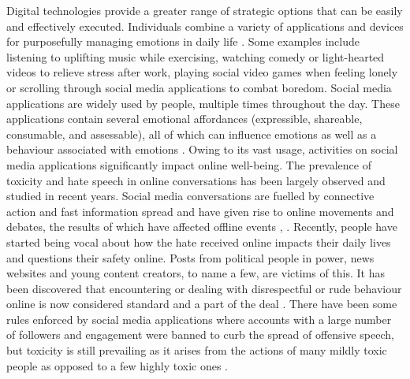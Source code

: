 \documentclass[acmtog]{acmart}
\begin{document}
Digital technologies provide a greater range of strategic options that can be easily and effectively executed. Individuals combine a variety of applications and devices for purposefully managing emotions in daily life \cite{smith2022digital}. Some examples include listening to uplifting music while exercising, watching comedy or light-hearted videos to relieve stress after work, playing social video games when feeling lonely or scrolling through social media applications to combat boredom. Social media applications are widely used by people, multiple times throughout the day. These applications contain several emotional affordances (expressible, shareable, consumable, and assessable), all of which can influence emotions as well as a behaviour associated with emotions \cite{steinert2022emotions}. Owing to its vast usage, activities on social media applications significantly impact online well-being. The prevalence of toxicity and hate speech in online conversations has been largely observed and studied in recent years. Social media conversations are fuelled by connective action and fast information spread and have given rise to online movements and debates, the results of which have affected offline events \cite{saveski2021structure}, \cite{mirbabaie2021development}. Recently, people have started being vocal about how the hate received online impacts their daily lives and questions their safety online. Posts from political people in power, news websites and young content creators, to name a few, are victims of this. It has been discovered that encountering or dealing with disrespectful or rude behaviour online is now considered standard and a part of the deal \cite{thomas2022s}. There have been some rules enforced by social media applications where accounts with a large number of followers and engagement were banned to curb the spread of offensive speech, but toxicity is still prevailing as it arises from the actions of many mildly toxic people as opposed to a few highly toxic ones \cite{saveski2021structure}. 
\end{document}
